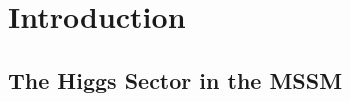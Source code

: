 %
%
%


\restoregeometry
\clearpage

\section{Introduction } \label{sec:intro}

\subsection{The Higgs Sector in the MSSM}

